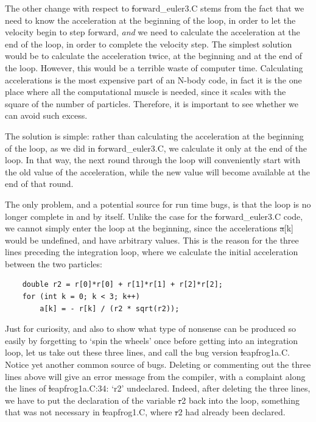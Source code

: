 The other change with respect to {\st forward\_euler3.C} stems from
the fact that we need to know the acceleration at the beginning of the
loop, in order to let the velocity begin to step forward, {\it and} we
need to calculate the acceleration at the end of the loop, in order to
complete the velocity step.  The simplest solution would be to
calculate the acceleration twice, at the beginning and at the end of
the loop.  However, this would be a terrible waste of computer time.
Calculating accelerations is the most expensive part of an N-body code,
in fact it is the one place where all the computational muscle is
needed, since it scales with the square of the number of particles.
Therefore, it is important to see whether we can avoid such excess.

The solution is simple: rather than calculating the acceleration at
the beginning of the loop, as we did in {\st forward\_euler3.C}, we
calculate it only at the end of the loop.  In that way, the next round
through the loop will conveniently start with the old value of the
acceleration, while the new value will become available at the end of
that round.

The only problem, and a potential source for run time bugs, is that the
loop is no longer complete in and by itself.  Unlike the case for the
{\st forward\_euler3.C} code, we cannot simply enter the loop at the
beginning, since the accelerations {\st a[k]} would be undefined, and
have arbitrary values.  This is the reason for the three lines
preceding the integration loop, where we calculate the initial
acceleration between the two particles:

\begin{small}
\begin{verbatim}
    double r2 = r[0]*r[0] + r[1]*r[1] + r[2]*r[2];
    for (int k = 0; k < 3; k++)
        a[k] = - r[k] / (r2 * sqrt(r2));
\end{verbatim}
\end{small}

Just for curiosity, and also to show what type of nonsense can be
produced so easily by forgetting to `spin the wheels' once before
getting into an integration loop, let us take out these three lines,
and call the bug version {\st leapfrog1a.C}.  Notice yet another
common source of bugs.  Deleting or commenting out the three lines
above will give an error message from the compiler, with a complaint
along the lines of {\st leapfrog1a.C:34: `r2' undeclared}.  Indeed,
after deleting the three lines, we have to put the declaration of the
variable {\st r2} back into the loop, something that was not necessary
in {\st leapfrog1.C}, where {\st r2} had already been declared.

